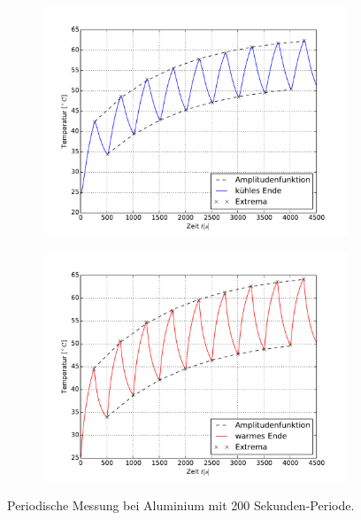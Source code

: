 \begin{figure}[h!]
	\centering
	\begin{subfigure}{0.9\textwidth}
	\centering
	\includegraphics[width=\textwidth]{Bilder/M3_Alu_kuehl.pdf}
	\end{subfigure}
	\begin{subfigure}{0.9\textwidth}
	\centering
	\includegraphics[width=\textwidth]{Bilder/M3_Alu_warm.pdf}
	\end{subfigure}
	\caption{Periodische Messung bei Aluminium mit 200 Sekunden-Periode.}
	\label{fig:M3Alu}
\end{figure}
